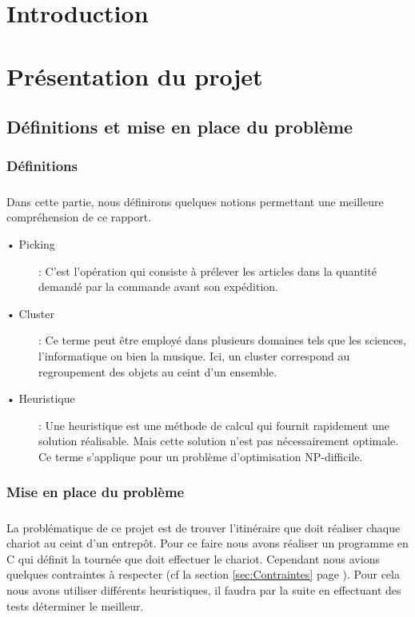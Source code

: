 \documentclass[twoside,UTF8]{EPURapport}
\begin{document}

\chapter{Introduction}


\chapter{Présentation du projet}

\section{Définitions et mise en place du problème}
\subsection{Définitions}
\paragraph{}Dans cette partie, nous définirons quelques notions permettant une meilleure compréhension de ce rapport.
\begin{description}
\item[• Picking]: C'est l'opération qui consiste à prélever les articles dans la quantité demandé par la commande avant son expédition.

\item[• Cluster]: Ce terme peut être employé dans plusieurs domaines tels que les sciences, l'informatique ou bien la musique. Ici, un cluster correspond au regroupement des objets au ceint d'un ensemble.
\item[• Heuristique] : Une heuristique est une méthode de calcul qui fournit rapidement une solution réalisable. Mais cette solution n'est pas nécessairement optimale. Ce terme s'applique pour un problème d'optimisation NP-difficile.
\end{description}


\subsection{Mise en place du problème }
\paragraph{}La problématique de ce projet est de trouver l'itinéraire que doit réaliser chaque chariot au ceint d'un entrepôt. Pour ce faire nous avons réaliser un programme en C qui définit la tournée que doit effectuer le chariot. Cependant nous avions quelques contraintes à respecter (cf la section \ref{sec:Contraintes} page \pageref{sec:Contraintes}). Pour cela nous avons utiliser différents heuristiques, il faudra par la suite en effectuant des tests déterminer le meilleur.
\end{document}
